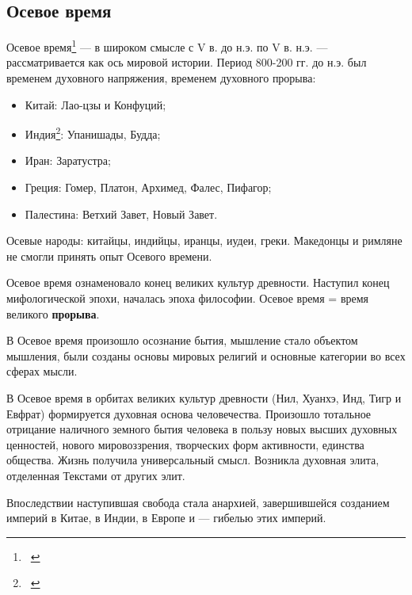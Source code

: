 \documentclass[a4paper]{article}
\title{\textcyrillic{Осевое время}}
\newcommand\liststyleWWviiiNumi{%
\renewcommand\labelitemi{{\textbullet}}
\renewcommand\labelitemii{o}
\renewcommand\labelitemiii{${\blacksquare}$}
\renewcommand\labelitemiv{{\textbullet}}
}
\begin{document}
\clearpage\setcounter{page}{1}\pagestyle{Standard}
\subsection{Осевое время}
{
Осевое время\footnote{\ } — в широком смысле с
\foreignlanguage{english}{V} в. до н.э. по \foreignlanguage{english}{V} в. н.э. — рассматривается как ось мировой
истории. Период 800-200 гг. до н.э. был временем духовного напряжения, временем духовного прорыва:}

\liststyleWWviiiNumi
\begin{itemize}
\item {
Китай: Лао-цзы и Конфуций;}
\item {
Индия\footnote{\ }: Упанишады, Будда;}
\item {
Иран: Заратустра;}
\item {
Греция: Гомер, Платон, Архимед, Фалес, Пифагор;}
\item {
Палестина: Ветхий Завет, Новый Завет.}
\end{itemize}
{
Осевые народы: китайцы, индийцы, иранцы, иудеи, греки. Македонцы и римляне не смогли принять опыт Осевого времени.}

{
Осевое время ознаменовало конец великих культур древности. Наступил конец мифологической эпохи, началась эпоха
философии. Осевое время = время великого \textbf{прорыва}. }

{
В Осевое время произошло осознание бытия, мышление стало объектом мышления, были созданы основы мировых религий и
основные категории во всех сферах мысли. }

{
В Осевое время в орбитах великих культур древности (Нил, Хуанхэ, Инд, Тигр и Евфрат) формируется духовная основа
человечества. Произошло тотальное отрицание наличного земного бытия человека в пользу новых высших духовных ценностей,
нового мировоззрения, творческих форм активности, единства общества. Жизнь получила универсальный смысл. Возникла
духовная элита, отделенная Текстами от других элит.}

{
Впоследствии наступившая свобода стала анархией, завершившейся созданием империй в Китае, в Индии, в Европе и — гибелью
этих империй. }
\end{document}

